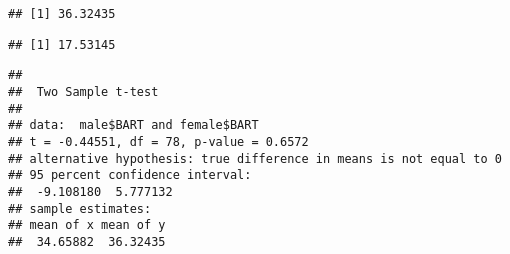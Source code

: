\documentclass[]{article}
\newenvironment{Shaded}{\begin{snugshade}}{\end{snugshade}}
\newcommand{\KeywordTok}[1]{\textcolor[rgb]{0.13,0.29,0.53}{\textbf{#1}}}
\newcommand{\DataTypeTok}[1]{\textcolor[rgb]{0.13,0.29,0.53}{#1}}
\newcommand{\DecValTok}[1]{\textcolor[rgb]{0.00,0.00,0.81}{#1}}
\newcommand{\StringTok}[1]{\textcolor[rgb]{0.31,0.60,0.02}{#1}}
\newcommand{\CommentTok}[1]{\textcolor[rgb]{0.56,0.35,0.01}{\textit{#1}}}
\newcommand{\OtherTok}[1]{\textcolor[rgb]{0.56,0.35,0.01}{#1}}
\newcommand{\OperatorTok}[1]{\textcolor[rgb]{0.81,0.36,0.00}{\textbf{#1}}}
\newcommand{\NormalTok}[1]{#1}
\begin{document}
\begin{verbatim}
## [1] 36.32435
\end{verbatim}

\begin{Shaded}
\end{Shaded}

\begin{verbatim}
## [1] 17.53145
\end{verbatim}

\begin{Shaded}
\end{Shaded}

\begin{verbatim}
## 
##  Two Sample t-test
## 
## data:  male$BART and female$BART
## t = -0.44551, df = 78, p-value = 0.6572
## alternative hypothesis: true difference in means is not equal to 0
## 95 percent confidence interval:
##  -9.108180  5.777132
## sample estimates:
## mean of x mean of y 
##  34.65882  36.32435
\end{verbatim}

\begin{Shaded}
\end{Shaded}
\end{document}
